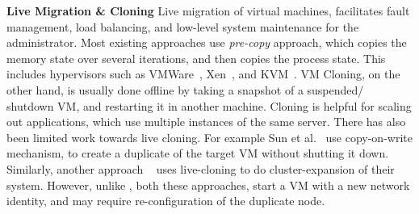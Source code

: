 \noindent
\textbf{Live Migration \& Cloning}
Live migration of virtual machines, facilitates fault management, load balancing, and low-level system maintenance for the administrator.
Most existing approaches use \textit{pre-copy} approach, which copies the memory state over several iterations, and then copies the process state.
This includes hypervisors such as VMWare~\cite{nelson2005fast}, Xen~\cite{clark2005live}, and KVM~\cite{kivity2007kvm}.
VM Cloning, on the other hand, is usually done offline by taking a snapshot of a suspended/ shutdown VM, and restarting it in another machine.
Cloning is helpful for scaling out applications, which use multiple instances of the same server.
There has also been limited work towards live cloning. 
For example Sun et al.~\cite{Sun:2009:FLC:1581383.1582148} use copy-on-write mechanism, to create a duplicate of the target VM without shutting it down.
Similarly, another approach ~\cite{gebhart2009dynamic} uses live-cloning to do cluster-expansion of their system.
However, unlike \parikshan, both these approaches, start a VM with a new network identity, and may require re-configuration of the duplicate node.
  